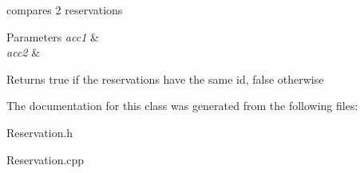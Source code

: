 compares 2 reservations 


\begin{DoxyParams}{Parameters}
{\em acc1} & \\
\hline
{\em acc2} & \\
\hline
\end{DoxyParams}
\begin{DoxyReturn}{Returns}
true if the reservations have the same id, false otherwise 
\end{DoxyReturn}


The documentation for this class was generated from the following files\+:\begin{DoxyCompactItemize}
\item 
Reservation.\+h\item 
Reservation.\+cpp\end{DoxyCompactItemize}
